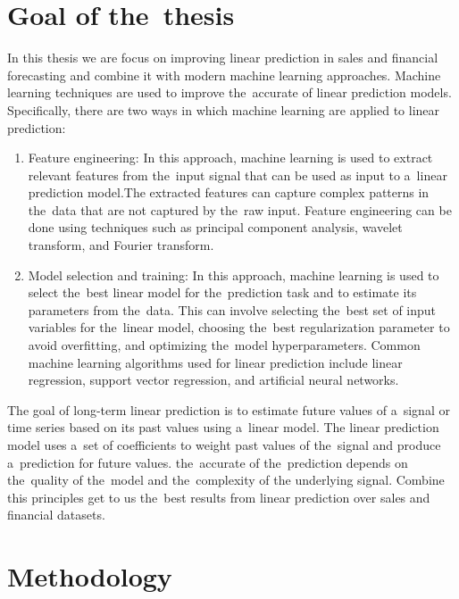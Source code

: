\chapter{Goal of the~thesis}\label{sec:goal}
In this thesis we are focus on improving linear prediction in sales and financial forecasting and combine it with
modern machine learning approaches. Machine learning techniques are used to improve the~accurate of linear
prediction models. Specifically, there are two ways in which machine learning are applied to linear prediction:
\begin{enumerate}
    \item Feature engineering: In this approach, machine learning is used to extract relevant features from the~input
    signal that can be used as input to a~linear prediction model.The extracted features can capture complex patterns
    in the~data that are not captured by the~raw input. Feature engineering can be done using techniques such as
    principal component analysis, wavelet transform, and Fourier transform.
    \item Model selection and training: In this approach, machine learning is used to select the~best linear
    model for the~prediction task and to estimate its parameters from the~data. This can involve selecting the~best
    set of input variables for the~linear model, choosing the~best regularization parameter to avoid overfitting, and
    optimizing the~model hyperparameters. Common machine learning algorithms used for linear prediction include linear
    regression, support vector regression, and artificial neural networks.
\end{enumerate}
The goal of long-term linear prediction is to estimate future values of a~signal or time series based on its past
values using a~linear model.
The linear prediction model uses a~set of coefficients to weight past values of the~signal and produce a~prediction for
future values. the~accurate of the~prediction depends on the~quality of the~model and the~complexity of the
underlying signal. Combine this principles get to us the~best results from linear prediction over
sales and financial datasets.
\chapter{Methodology}\label{sec:methodology}
